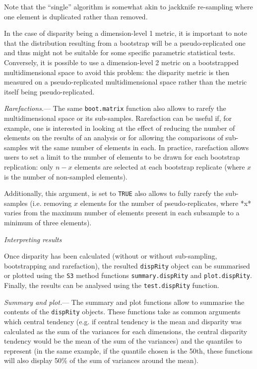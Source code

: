 \documentclass[12pt,letterpaper]{article}
\renewcommand{\subsection}[1]{%
\bigskip
\begin{center}
\begin{large}
\normalfont\itshape #1
\end{large}
\end{center}}
\renewcommand{\subsubsection}[1]{%
\vspace{2ex}
\noindent
\textit{#1.}---}
\newcommand{\disp}{\texttt{dispRity} }
\begin{document}
\noindent Note that the ``single'' algorithm is somewhat akin to jackknife re-sampling where one element is duplicated rather than removed.

In the case of disparity being a dimension-level 1 metric, it is important to note that the distribution resulting from a bootstrap will be a pseudo-replicated one and thus might not be suitable for some specific parametric statistical tests.
Conversely, it is possible to use a dimension-level 2 metric on a bootstrapped multidimensional space to avoid this problem: the disparity metric is then measured on a pseudo-replicated multidimensional space rather than the metric itself being pseudo-replicated.

\subsubsection{Rarefactions}
The same \texttt{boot.matrix} function also allows to rarefy the multidimensional space or its sub-samples.
Rarefaction can be useful if, for example, one is interested in looking at the effect of reducing the number of elements on the results of an analysis or for allowing the comparisons of sub-samples wit the same number of elements in each.
In practice, rarefaction allows users to set a limit to the number of elements to be drawn for each bootstrap replication: only $n-x$ elements are selected at each bootstrap replicate (where $x$ is the number of non-sampled elements).

Additionally, this argument, is set to \texttt{TRUE} also allows to fully rarefy the sub-samples (i.e. removing $x$ elements for the number of pseudo-replicates, where *x* varies from the maximum number of elements present in each subsample to a minimum of three elements).

\subsection{Interpreting results}
Once disparity has been calculated (without or without sub-sampling, bootstrapping and rarefaction), the resulted \disp object can be summarised or plotted using the \texttt{S3} method functions \texttt{summary.dispRity} and \texttt{plot.dispRity}.
Finally, the results can be analysed using the \texttt{test.dispRity} function.

\subsubsection{Summary and plot}
The summary and plot functions allow to summarise the contents of the \disp objects.
These functions take as common arguments which central tendency (e.g. if central tendency is the mean and disparity was calculated as the sum of the variances for each dimensions, the central disparity tendency would be the mean of the sum of the variances) and the quantiles to represent (in the same example, if the quantile chosen is the 50th, these functions will also display 50\% of the sum of variances around the mean).
\end{document}
